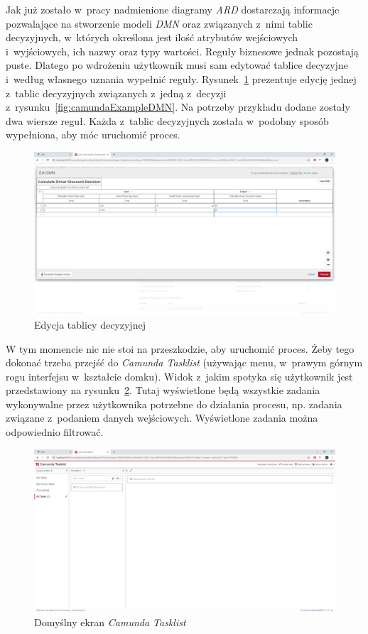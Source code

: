 Jak już zostało w~pracy nadmienione diagramy \emph{ARD} dostarczają informacje pozwalające na stworzenie modeli \emph{DMN} oraz związanych z~nimi tablic decyzyjnych, w~których określona jest ilość atrybutów wejściowych i~wyjściowych, ich nazwy oraz typy wartości. Reguły biznesowe jednak pozostają puste. Dlatego po wdrożeniu użytkownik musi sam edytować tablice decyzyjne i~według własnego uznania wypełnić reguły. Rysunek~\ref{fig:camundaExampleRules} prezentuje edycję jednej z~tablic decyzyjnych związanych z~jedną z~decyzji z~rysunku~\ref{fig:camundaExampleDMN}. Na potrzeby przykładu dodane zostały dwa wiersze reguł. Każda z~tablic decyzyjnych została w~podobny sposób wypełniona, aby móc uruchomić proces.
\begin{figure}
    \centering
    \includegraphics[width=\textwidth]{./assets/camundaExampleRules.png}
    \caption{Edycja tablicy decyzyjnej}
    \label{fig:camundaExampleRules}
\end{figure}

W tym momencie nic nie stoi na przeszkodzie, aby uruchomić proces. Żeby tego dokonać trzeba przejść do \emph{Camunda Tasklist} (używając menu, w~prawym górnym rogu interfejsu w~kształcie domku). Widok z~jakim spotyka się użytkownik jest przedstawiony na rysunku~\ref{fig:camundaTasklistDefault}. Tutaj wyświetlone będą wszystkie zadania wykonywalne przez użytkownika potrzebne do działania procesu, np. zadania związane z~podaniem danych wejściowych. Wyświetlone zadania można odpowiednio filtrować.
\begin{figure}
    \centering
    \includegraphics[width=\textwidth]{./assets/camundaTasklistDefault.png}
    \caption{Domyślny ekran \emph{Camunda Tasklist}}
    \label{fig:camundaTasklistDefault}
\end{figure}

